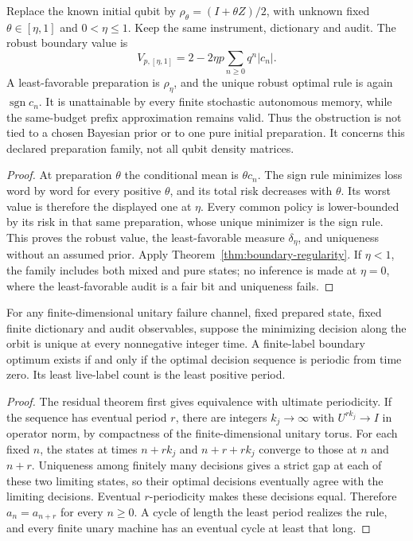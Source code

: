 \begin{corollary}\label{cor:polarization-boundary}
Replace the known initial qubit by
$\rho_\theta=(I+\theta Z)/2$, with unknown fixed $\theta\in[\eta,1]$ and $0<\eta\le1$. Keep the same instrument, dictionary and audit. The robust boundary value is
\[
 V_{p,[\eta,1]}=2-2\eta p\sum_{n\ge0}q^n|c_n|.
\]
A least-favorable preparation is $\rho_\eta$, and the unique robust optimal rule is again $\operatorname{sgn}c_n$. It is unattainable by every finite stochastic autonomous memory, while the same-budget prefix approximation remains valid. Thus the obstruction is not tied to a chosen Bayesian prior or to one pure initial preparation. It concerns this declared preparation family, not all qubit density matrices.
\end{corollary}
\begin{proof}
At preparation $\theta$ the conditional mean is $\theta c_n$. The sign rule minimizes loss word by word for every positive $\theta$, and its total risk decreases with $\theta$. Its worst value is therefore the displayed one at $\eta$. Every common policy is lower-bounded by its risk in that same preparation, whose unique minimizer is the sign rule. This proves the robust value, the least-favorable measure $\delta_\eta$, and uniqueness without an assumed prior. Apply Theorem~\ref{thm:boundary-regularity}. If $\eta<1$, the family includes both mixed and pure states; no inference is made at $\eta=0$, where the least-favorable audit is a fair bit and uniqueness fails.
\end{proof}

\begin{corollary}\label{cor:unitary-period}
For any finite-dimensional unitary failure channel, fixed prepared state, fixed finite dictionary and audit observables, suppose the minimizing decision along the orbit is unique at every nonnegative integer time. A finite-label boundary optimum exists if and only if the optimal decision sequence is periodic from time zero. Its least live-label count is the least positive period.
\end{corollary}
\begin{proof}
The residual theorem first gives equivalence with ultimate periodicity. If the sequence has eventual period $r$, there are integers $k_j\to\infty$ with $U^{rk_j}\to I$ in operator norm, by compactness of the finite-dimensional unitary torus. For each fixed $n$, the states at times $n+rk_j$ and $n+r+rk_j$ converge to those at $n$ and $n+r$. Uniqueness among finitely many decisions gives a strict gap at each of these two limiting states, so their optimal decisions eventually agree with the limiting decisions. Eventual $r$-periodicity makes these decisions equal. Therefore $a_n=a_{n+r}$ for every $n\ge0$. A cycle of length the least period realizes the rule, and every finite unary machine has an eventual cycle at least that long.
\end{proof}

